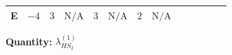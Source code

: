\documentclass[8pt]{article}
\begin{document}
\begin{landscape}
\begin{longtable}{@{}llcccccc >{\raggedright\arraybackslash}p{0.21\linewidth} >{\raggedright\arraybackslash}p{0.21\linewidth} >{\raggedright\arraybackslash}p{0.21\linewidth}@{}}
E & $-4$ & $3$ & $\text{N/A}$ & $3$ & $\text{N/A}$ & $2$ & $\text{N/A}$ & \scriptsize\adjustbox{max width=\linewidth}{$\begin{gathered} -\frac{33 {g_2}^2 {\lambda_{HS_2}^{(1)}}}{2}\end{gathered}$} & \scriptsize\adjustbox{max width=\linewidth}{$\begin{gathered} +3 {g_1}^4\end{gathered}$} & \scriptsize\adjustbox{max width=\linewidth}{$\begin{gathered} -\frac{15 {g_1}^2 {\lambda_{HS_2}^{(1)}}}{2}\end{gathered}$} \\
\midrule
\bottomrule
\end{longtable}
\clearpage
\noindent\textbf{Quantity: }$\lambda_{HS_2}^{(1)}$\par\smallskip

\end{landscape}
\end{document}
